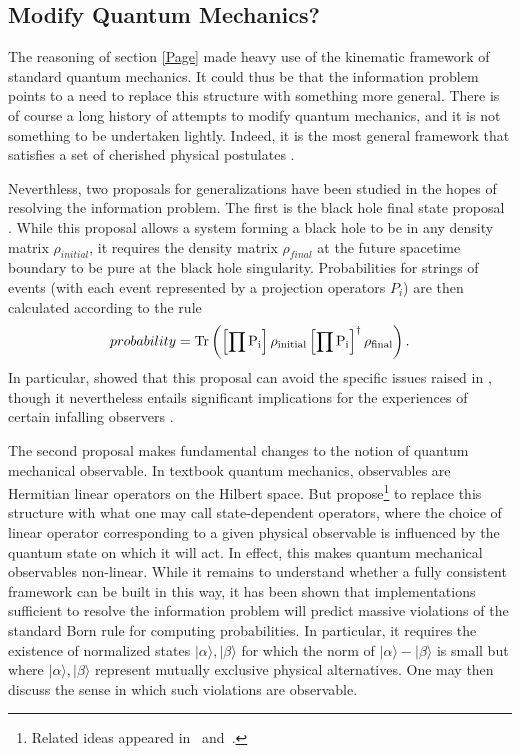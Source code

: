 \documentclass[12pt]{article}
\begin{document}
\subsection{Modify Quantum Mechanics?}
\label{MQM}


The reasoning of section \ref{Page} made heavy use of the kinematic framework of standard quantum mechanics.  It could thus be that the information problem points to a need to replace this structure with something more general.  There is of course a long history of attempts to modify quantum mechanics, and it is not something to be undertaken lightly. Indeed, it is the most general framework that satisfies a set of cherished physical postulates \cite{Kapustin:2013yda}.

Neverthless, two proposals for generalizations have been studied in the hopes of resolving the information problem. The first is the black hole final state proposal \cite{Horowitz:2003he}.  While this proposal allows a system forming a black hole to be in any density matrix $\rho_{initial}$, it requires the density matrix $\rho_{final}$ at the future spacetime boundary to be pure at the black hole singularity.  Probabilities for strings of events (with each event represented by a projection operators $P_{i}$) are then calculated according to the rule
\begin{equation}
probability = \rm{Tr} \left(\left[\prod P_i \right]\rho_{initial} \left[\prod P_i \right]^\dagger \rho_{final} \right).
\end{equation}
In particular, \cite{Lloyd:2013bza} showed that this proposal can avoid the specific issues raised in \cite{Almheiri:2012rt,Almheiri:2013hfa}, though it nevertheless entails significant implications for the experiences of certain infalling observers \cite{Lloyd:2013bza,Bousso:2013uka}.

The second proposal makes fundamental changes to the notion of quantum mechanical observable.  In textbook quantum mechanics, observables are Hermitian linear operators on the Hilbert space.  But \cite{Papadodimas:2012aq,Papadodimas:2013wnh,Papadodimas:2013jku,Papadodimas:2013kwa,Papadodimas:2015xma,Papadodimas:2015jra} propose\footnote{Related ideas
appeared in~\cite{Nomura:2012sw,Nomura:2013gna,Nomura:2012ex} and~\cite{Verlinde:2012cy,Verlinde:2013uja,Verlinde:2013vja,Verlinde:2013qya}.} to replace this structure with what one may call state-dependent operators, where the choice of linear operator corresponding to a given physical observable is influenced by the quantum state on which it will act.  In effect, this makes quantum mechanical observables non-linear.  While it remains to understand whether a fully consistent framework can be built in this way, it has been shown \cite{Marolf:2015dia} that implementations sufficient to resolve the information problem will predict massive violations of the standard Born rule for computing probabilities.  In particular, it requires the existence of normalized states  $|\alpha \rangle, |\beta \rangle$ for which the norm of $|\alpha \rangle - |\beta \rangle$ is small but where $|\alpha \rangle, |\beta \rangle$ represent mutually exclusive physical alternatives.  One may then discuss \cite{Marolf:2015dia,Raju:2016vsu} the sense in which such violations are observable.
\end{document}
